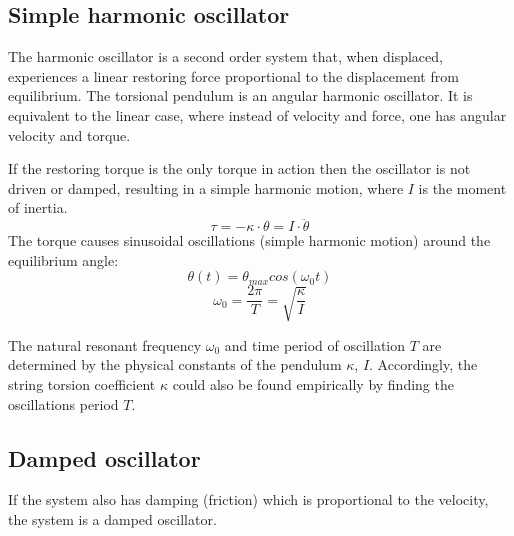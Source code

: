 \documentclass[\main/master.tex]{subfiles}
\begin{document}
\subsection{Simple harmonic oscillator}
The harmonic oscillator is a second order system that, when displaced, experiences a linear restoring force proportional to the displacement from equilibrium. The torsional pendulum is an angular harmonic oscillator. It is equivalent to the linear case, where instead of velocity and force, one has angular velocity and torque.
\par\noindent
If the restoring torque is the only torque in action then the oscillator is not driven or damped, resulting in a simple harmonic motion, where $I$ is the moment of inertia. 
\begin{equation}
\tau = -\kappa\cdot\theta  = I\cdot\ddot{\theta}   \label{eqn:undamped_motion_equation}
\end{equation}
The torque causes sinusoidal oscillations (simple harmonic motion) around the equilibrium angle:  
\begin{equation}
\theta(t) = \theta_{max}cos(\omega_0 t )    \label{eqn:undamped_motion_equation}
\end{equation}
\begin{equation}
\omega_0  = \frac{2\pi}{T} = \sqrt{\frac{\kappa}{I}}   \label{eqn:undamped_motion_equation}
\end{equation}
\par\noindent
The natural resonant frequency $\omega_0$ and time period of oscillation $T$ are determined by the physical constants of the pendulum $\kappa$, $I$. Accordingly, the string torsion coefficient $\kappa$ could also be found empirically by finding the oscillations period $T$.


\subsection{Damped oscillator}
If the system also has damping (friction) which is proportional to the velocity, the system is a damped oscillator.
\end{document}
